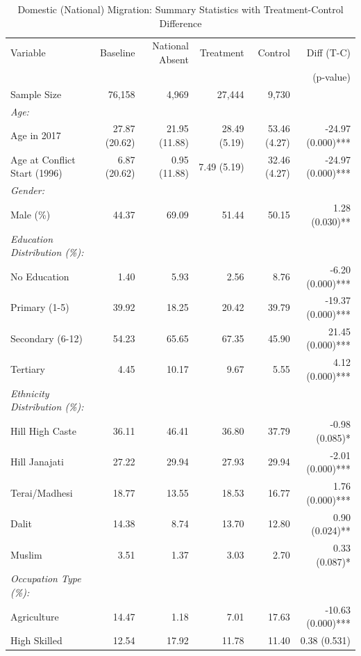 \begin{table}[htbp]
\centering
\caption{Domestic (National) Migration: Summary Statistics with Treatment-Control Difference}
\label{tab:domestic_migration_summary}
\small
\begin{tabular}{lrrrrr}
\toprule
Variable & Baseline & National Absent & Treatment & Control & Diff (T-C) \\
 & & & & & (p-value) \\
\midrule
Sample Size & 76,158 & 4,969 & 27,444 & 9,730 & \\
\addlinespace
\textit{Age:} & & & & & \\
Age in 2017 & 27.87 (20.62) & 21.95 (11.88) & 28.49 (5.19) & 53.46 (4.27) & -24.97 (0.000)*** \\
Age at Conflict Start (1996) & 6.87 (20.62) & 0.95 (11.88) & 7.49 (5.19) & 32.46 (4.27) & -24.97 (0.000)*** \\
\addlinespace
\textit{Gender:} & & & & & \\
Male (\%) & 44.37 & 69.09 & 51.44 & 50.15 & 1.28 (0.030)** \\
\addlinespace
\textit{Education Distribution (\%):} & & & & & \\
\quad No Education & 1.40 & 5.93 & 2.56 & 8.76 & -6.20 (0.000)*** \\
\quad Primary (1-5) & 39.92 & 18.25 & 20.42 & 39.79 & -19.37 (0.000)*** \\
\quad Secondary (6-12) & 54.23 & 65.65 & 67.35 & 45.90 & 21.45 (0.000)*** \\
\quad Tertiary & 4.45 & 10.17 & 9.67 & 5.55 & 4.12 (0.000)*** \\
\addlinespace
\textit{Ethnicity Distribution (\%):} & & & & & \\
\quad Hill High Caste & 36.11 & 46.41 & 36.80 & 37.79 & -0.98 (0.085)* \\
\quad Hill Janajati & 27.22 & 29.94 & 27.93 & 29.94 & -2.01 (0.000)*** \\
\quad Terai/Madhesi & 18.77 & 13.55 & 18.53 & 16.77 & 1.76 (0.000)*** \\
\quad Dalit & 14.38 & 8.74 & 13.70 & 12.80 & 0.90 (0.024)** \\
\quad Muslim & 3.51 & 1.37 & 3.03 & 2.70 & 0.33 (0.087)* \\
\addlinespace
\textit{Occupation Type (\%):} & & & & & \\
\quad Agriculture & 14.47 & 1.18 & 7.01 & 17.63 & -10.63 (0.000)*** \\
\quad High Skilled & 12.54 & 17.92 & 11.78 & 11.40 & 0.38 (0.531) \\

\end{tabular}
\end{table}
